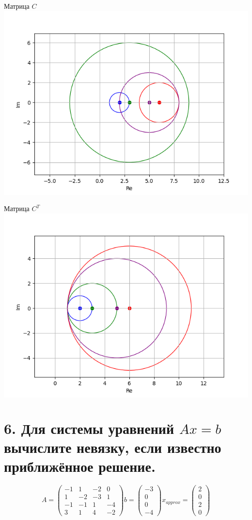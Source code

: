 \documentclass[a4paper,14pt]{article}
\begin{document}
Матрица $C$\\
\includegraphics{matrix_c.png}

Матрица $C^T$\\
\includegraphics{matrix_ct.png}

\section{6. Для системы уравнений $Ax = b$ вычислите невязку, если известно приближённое решение.}
$$
A = \begin{pmatrix}
    -1 & 1 & -2 & 0 \\
    1 & -2 & -3 & 1 \\
    -1 & -1 & 1 & -4 \\
    3 & 1 & 4 & -2
    \end{pmatrix}
b = \begin{pmatrix}
    -3 \\
    0 \\
    0 \\
    -4
    \end{pmatrix}
x_{approx} = \begin{pmatrix}
    2 \\
    0 \\
    2 \\
    0
    \end{pmatrix}
$$\\
 
\end{document}
